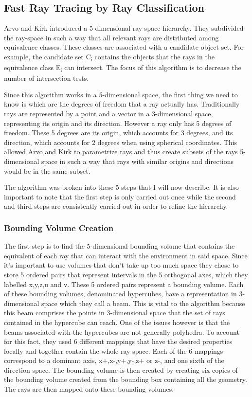 \documentclass{llncs}
\begin{document}
%
\subsection{Fast Ray Tracing by Ray Classification}
%

Arvo and Kirk \cite{ArvoKirk87} introduced a 5-dimensional ray-space hierarchy. They subdivided the ray-space in such a way that all relevant rays are distributed among equivalence classes. These classes are associated with a candidate object set. For example, the candidate set C\textsubscript{i} contains the objects that the rays in the equivalence class E\textsubscript{i} can intersect. The focus of this algorithm is to decrease the number of intersection tests.

\medskip

Since this algorithm works in a 5-dimensional space, the first thing we need to know is which are the degrees of freedom that a ray actually has. Traditionally rays are represented by a point and a vector in a 3-dimensional space, representing its origin and its direction. However a ray only has 5 degrees of freedom. These 5 degrees are its origin, which accounts for 3 degrees, and its direction, which accounts for 2 degrees when using spherical coordinates. This allowed Arvo and Kirk to parametrize rays and thus create subsets of the rays 5-dimensional space in such a way that rays with similar origins and directions would be in the same subset. 

\medskip

The algorithm was broken into these 5 steps that I will now describe. It is also important to note that the first step is only carried out once while the second and third steps are consistently carried out in order to refine the hierarchy.

\subsubsection{Bounding Volume Creation}

The first step is to find the 5-dimensional bounding volume that contains the equivalent of each ray that can interact with the environment in said space. Since it's important to use volumes that don't take up too much space they chose to store 5 ordered pairs that represent intervals in the 5 orthogonal axes, which they labelled x,y,z,u and v. These 5 ordered pairs represent a bounding volume. Each of these bounding volumes, denominated hypercubes, have a representation in 3-dimensional space which they call a beam. This is vital to the algorithm because this beam comprises the points in 3-dimensional space that the set of rays contained in the hypercube can reach. One of the issues however is that the beams associated with the hypercubes are not generally polyhedra. To account for this fact, they used 6 different mappings that have the desired properties locally and together contain the whole ray-space. Each of the 6 mappings correspond to a dominant axis, x+,x-,y+,y-,z+ or z-, and one sixth of the direction space. The bounding volume is then created by creating six copies of the bounding volume created from the bounding box containing all the geometry. The rays are then mapped onto these bounding volumes.
\end{document}

